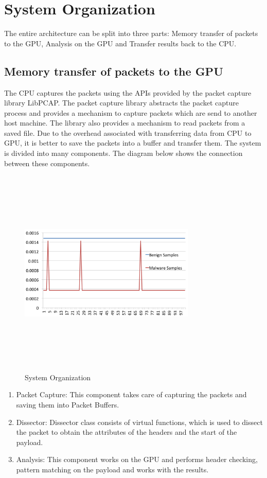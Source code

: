 \chapter{System Organization}
The entire architecture can be split into three parts: Memory transfer of packets to the GPU, Analysis on the GPU and Transfer results back to the CPU.

\section{Memory transfer of packets to the GPU}
The CPU captures the packets using the APIs provided by the packet capture library LibPCAP.  The packet capture library abstracts the packet capture process and provides a mechanism to capture packets which are send to another host machine. The library also provides a mechanism to read packets from a saved file. Due to the overhead associated with transferring data from CPU to GPU, it is better to save the packets into a buffer and transfer them.
The system is divided into many components. The diagram below shows the connection between these components.


\begin{figure}
	\centering
	\includegraphics[width=8.4cm, height=10cm]{500.png}
	\caption{System Organization}
	\label{fig:systemorganization}
\end{figure}

\begin{enumerate}
	\item Packet Capture: This component takes care of capturing the packets and saving them into Packet Buffers. 
	\item Dissector: Dissector class consists of virtual functions, which is used to dissect the packet to obtain the attributes of the headers and the start of the payload. 
	\item Analysis: This component works on the GPU and performs header checking, pattern matching on the payload and works with the results.
\end{enumerate}

